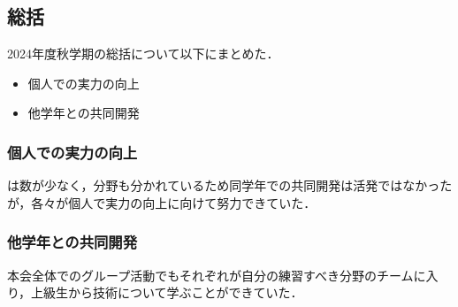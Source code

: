 \subsection*{\secondGrade{}総括}


2024年度秋学期の\secondGrade{}総括について以下にまとめた．

\begin{itemize}
    \item 個人での実力の向上
    \item 他学年との共同開発
\end{itemize}

\subsubsection*{個人での実力の向上}
\secondGrade{}は数が少なく，分野も分かれているため同学年での共同開発は活発ではなかったが，各々が個人で実力の向上に向けて努力できていた．

\subsubsection*{他学年との共同開発}
本会全体でのグループ活動でもそれぞれが自分の練習すべき分野のチームに入り，上級生から技術について学ぶことができていた．
